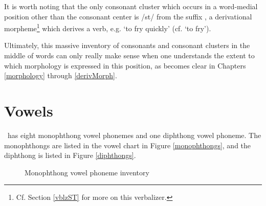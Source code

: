 It is worth noting that the only consonant cluster which occurs in a word-medial position other than the consonant center is /st/ from the suffix , a derivational morpheme\footnote{Cf. Section \ref{vblzST} for more on this verbalizer.} 
which derives a verb, e.g.   ‘to fry quickly’ (cf.  ‘to fry’).%

Ultimately, this massive inventory of consonants and consonant clusters in the middle of words can only really make sense when one understands the extent to which morphology is expressed in this position, as becomes clear in Chapters \ref{morphology} through \ref{derivMorph}. 



\clearpage
\section{Vowels}\label{vowels}\label{vowelPhonemes}
\PS\ has eight monophthong vowel phonemes and one diphthong vowel phoneme. The monophthongs are listed in the vowel chart in Figure \vref{monophthongs}, and the diphthong is listed in Figure \vref{diphthongs}. 
\begin{figure}
\centering
\begin{vowel} %
\end{vowel}
\caption[Monophthong inventory]{Monophthong vowel phoneme inventory} \label{monophthongs}
\end{figure}

